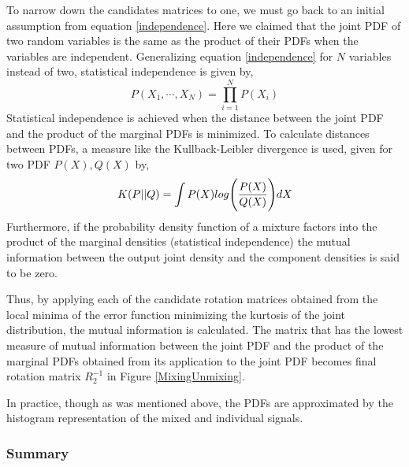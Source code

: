 To narrow down the candidates matrices to one, we
must go back to an initial assumption from equation
\ref{independence}. Here we claimed that the joint PDF of two 
random variables is the same as the product of their PDFs
when the variables are independent. Generalizing equation
\ref{independence} for $N$ variables instead of two, statistical independence
is given by,
\begin{equation}
\label{statisticalIndependence}
P(X_{1},\cdots,X_{N}) = \prod_{i = 1}^N P(X_{i})
\end{equation}
Statistical independence is achieved when the distance between the
joint PDF and the product of the marginal PDFs is minimized.
To calculate distances between PDFs, a measure like the
Kullback-Leibler divergence is used, given for two PDF $P(X), Q(X)$
by, 
\begin{equation}
\label{generalKL}
K(P||Q) = \int P(X)log \Biggl( { P(X)\over Q(X)} \Biggr) dX
\end{equation}
Furthermore, if the probability density function of a mixture factors
into the product of the marginal densities (statistical independence)
the mutual information between the output joint density and the
component densities is said to be zero. 

Thus, by applying each of the candidate rotation matrices obtained
from the local minima of the error function minimizing the kurtosis 
of the joint distribution, the mutual information is calculated. 
The matrix that has the lowest measure of mutual information between 
the joint PDF and the product of the marginal PDFs obtained from its
application to the joint PDF becomes final rotation matrix
$R_{2}^{-1}$ in Figure \ref{MixingUnmixing}.

In practice, though as was mentioned above, the PDFs are approximated 
by the histogram representation of the mixed and individual signals. 

\vspace{5mm}
\subsubsection{Summary}

